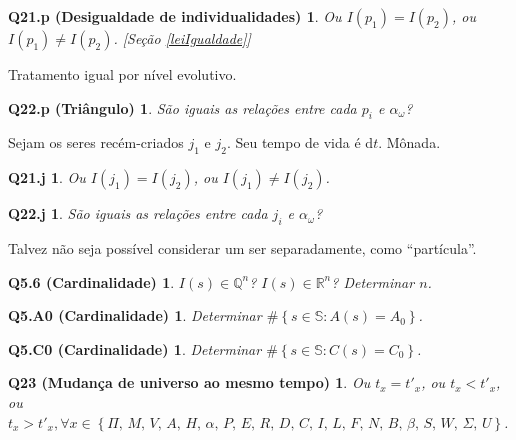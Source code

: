 \documentclass[12pt,a4paper]{article}
\begin{document}
			\newtheorem{Q21.p}{Q21.p (Desigualdade de individualidades)}
			\begin{Q21.p} Ou $ I(p_1) = I(p_2) $, ou $ I(p_1) \neq I(p_2) $. [Se\c{c}\~ao \ref{leiIgualdade}]
			\end{Q21.p}

			Tratamento igual por n\'ivel evolutivo.

			\newtheorem{Q22.p}{Q22.p (Tri\^angulo)}
			\begin{Q22.p} S\~ao iguais as rela\c{c}\~oes entre cada $ p_i $ e $ \alpha_\omega $?
			\end{Q22.p}

			Sejam os seres rec\'em-criados $ j_1 $ e $ j_2 $. Seu tempo de vida \'e d$t$. M\^onada.

			\newtheorem{Q21.j}{Q21.j}
			\begin{Q21.j} Ou $ I(j_1) = I(j_2) $, ou $ I(j_1) \neq I(j_2) $.
			\end{Q21.j}

			\newtheorem{Q22.j}{Q22.j}
			\begin{Q22.j} S\~ao iguais as rela\c{c}\~oes entre cada $ j_i $ e $ \alpha_\omega $?
			\end{Q22.j}

			Talvez n\~ao seja poss\'ivel considerar um ser separadamente, como \textquotedblleft part\'icula\textquotedblright.

			\newtheorem{Q5.6}{Q5.6 (Cardinalidade)}
			\begin{Q5.6} $I(s) \in \mathbb{Q}^n$? $I(s) \in \mathbb{R}^n$? Determinar $n$.
			\end{Q5.6}

			\newtheorem{Q5.A0}{Q5.A0 (Cardinalidade)}
			\begin{Q5.A0} Determinar $ \#\left\{s \in \mathbb{S} : A(s) = A_0 \right\}$.
			\end{Q5.A0}

			\newtheorem{Q5.C0}{Q5.C0 (Cardinalidade)}
			\begin{Q5.C0} Determinar $ \#\left\{s \in \mathbb{S} : C(s) = C_0 \right\}$.
			\end{Q5.C0}

			\newtheorem{Q23}{Q23 (Mudan\c{c}a de universo ao mesmo tempo)}
			\begin{Q23} Ou $ t_x = t'_x $, ou $ t_x < t'_x $, ou $ t_x > t'_x, \forall x \in \left\{ \Pi, \, M, \, V, \, A, \, H, \, \alpha, \, P, \, E, \, R, \, D, \, C, \, I, \, L, \, F, \, N, \, B, \, \beta, \, S, \, W, \, \Sigma, \, U\right\}$.
			\end{Q23}
\end{document}
